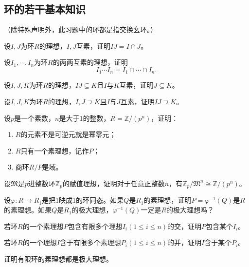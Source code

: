 \subsection{环的若干基本知识}
（除特殊声明外，此习题中的环都是指交换幺环。）
\begin{prob}
设$I,J$为环$R$的理想，$I,J$互素，证明$IJ=I\cap J$。
\end{prob}
\begin{prob}
设$I_{1},\cdots ,I_{n}$为环$R$的两两互素的理想，证明
\begin{equation*}
I_{1}\cdots I_{n}=I_{1}\cap \cdots \cap I_{n}.
\end{equation*}
\end{prob}
\begin{prob}
设$I,J,K$为环$R$的理想，$IJ\subseteq K$且$I$与$K$互素，证明$J\subseteq K$。
\end{prob}
\begin{prob}
设$I,J,K$为环$R$的理想，$I,J\supseteq K$且$I$与$J$互素，证明$IJ\supseteq K$。
\end{prob}
\begin{prob}
设$p$是一个素数，$n$是大于1的整数，$R=\mathbb{Z}/(p^n)$，证明：
\begin{enumerate}[$(1)$]
\item $R$的元素不是可逆元就是幂零元；
\item $R$只有一个素理想，记作$P$；
\item 商环$R/P$是域。
\end{enumerate}
\end{prob}
\begin{prob}
设$\mathfrak{M}$是$p$进整数环$\mathbb{Z}_p$的赋值理想，证明对于任意正整数$n$，有$\mathbb{Z}_p/\mathfrak{M}^{n}\cong \mathbb{Z}/(p^{n})$。
\end{prob}
\begin{prob}
设$\varphi :R\rightarrow R_{1}$是把1映成1的环同态。如果$Q$是$R_{1}$的素理想，证明$P=\varphi ^{-1}(Q)$是$R$的素理想。如果$Q$是$R_{1}$的极大理想，$\varphi ^{-1}\left(Q\right)$一定是$R$的极大理想吗？
\end{prob}
\begin{prob}
若环$R$的一个素理想$P$包含有限多个理想$I_{i}\left(1\leqslant i\leqslant n\right)$的交，证明$P$包含某个$I_{i}$。
\end{prob}
\begin{prob}
若环$R$的一个理想$I$含于有限多个素理想$P_{i}\left(1\leqslant i\leqslant n\right)$的并，证明$I$含于某个$P_{i}$。
\end{prob}
\begin{prob}
证明有限环的素理想都是极大理想。
\end{prob}
